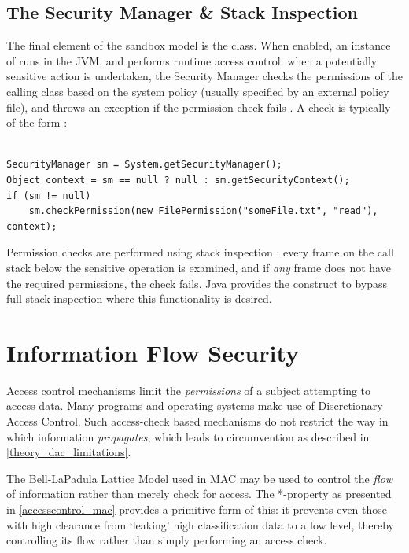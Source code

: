 \subsection{The Security Manager \& Stack Inspection}

The final element of the sandbox model is the  class. When enabled, an instance of  runs in the JVM, and performs runtime access control: when a potentially sensitive action is undertaken, the Security Manager checks the permissions of the calling class based on the system policy (usually specified by an external policy file), and throws an exception if the permission check fails \cite{gosling2014java}. A check is typically of the form \cite{javasecmanagerdoc}:

\begin{verbatim}

SecurityManager sm = System.getSecurityManager();
Object context = sm == null ? null : sm.getSecurityContext();
if (sm != null)
	sm.checkPermission(new FilePermission("someFile.txt", "read"), context);
\end{verbatim}

Permission checks are performed using stack inspection \cite{gong2003javasecurity}: every frame on the call stack below the sensitive operation is examined, and if \textit{any} frame does not have the required permissions, the check fails. Java provides the  construct to bypass full stack inspection \cite{gong2003javasecurity} where this functionality is desired.

\section{Information Flow Security}

Access control mechanisms limit the \textit{permissions} of a subject attempting to access data. Many programs and operating systems make use of Discretionary Access Control. Such access-check based mechanisms do not restrict the way in which information \textit{propagates}, which leads to circumvention as described in \ref{theory_dac_limitations}.

The Bell-LaPadula Lattice Model used in MAC may be used to control the \textit{flow} of information rather than merely check for access. The *-property as presented in \ref{accesscontrol_mac} provides a primitive form of this: it prevents even those with high clearance from `leaking' high classification data to a low level, thereby controlling its flow rather than simply performing an access check.

